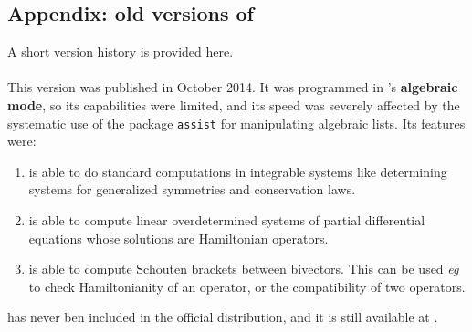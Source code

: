 \subsection{Appendix: old versions of \cde}

A short version history is provided here.

\paragraph{} This version was published in October 2014. It was
programmed in \REDUCE's \textbf{algebraic mode}, so its capabilities were
limited, and its speed was severely affected by the systematic use of the
package \texttt{assist} for manipulating algebraic lists. Its features were:
\begin{enumerate}
\item {} is able to do standard computations in integrable systems like
  determining systems for generalized symmetries and conservation laws.
\item {} is able to compute linear overdetermined systems of partial
  differential equations whose solutions are Hamiltonian operators.
\item \cde is able to compute Schouten brackets between bivectors. This can be
  used \emph{eg} to check Hamiltonianity of an operator, or the compatibility
  of two operators.
\end{enumerate}
 has never ben included in the official \REDUCE distribution, and it is
still available at \cite{gdeq}.


